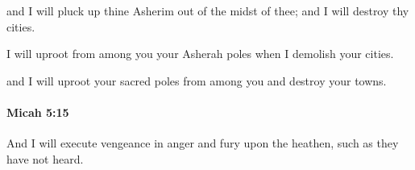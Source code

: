 			\begin{versebox}
					\item[BHS] 
					\item[LXX] 
					\item[ASV] and I will pluck up thine Asherim out of the midst of thee; and I will destroy thy cities.
					\item[NIV] I will uproot from among you your Asherah poles when I demolish your cities.
					\item[NRSV] and I will uproot your sacred poles from among you and destroy your towns.
			\end{versebox}

		\paragraph{Micah 5:15} %
			\label{MICAH-5-15}

			And I will execute vengeance in anger and fury upon the heathen, such as they have not heard.


